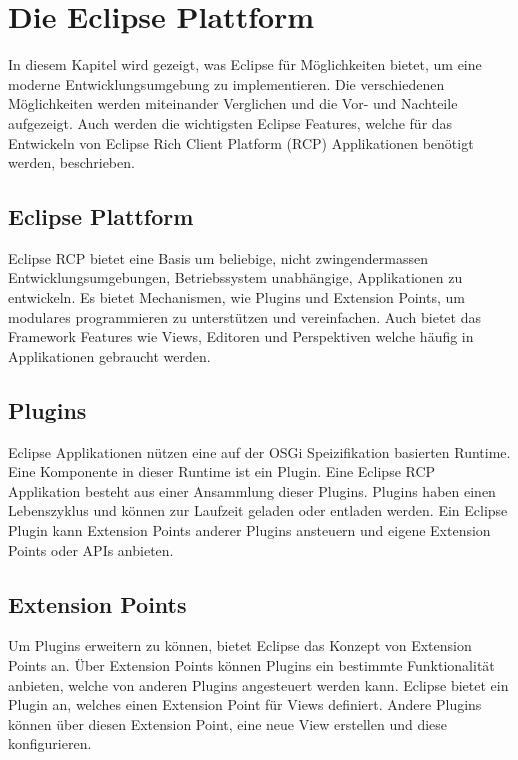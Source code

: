 \chapter{Die Eclipse Plattform}
\label{chap:platform}

In diesem Kapitel wird gezeigt, was Eclipse für Möglichkeiten bietet, um eine moderne Entwicklungsumgebung zu implementieren. Die verschiedenen Möglichkeiten werden miteinander Verglichen und die Vor- und Nachteile aufgezeigt. Auch werden die wichtigsten Eclipse Features, welche für das Entwickeln von Eclipse Rich Client Platform (RCP) Applikationen benötigt werden, beschrieben.

\section{Eclipse Plattform}

Eclipse RCP bietet eine Basis um beliebige, nicht zwingendermassen Entwicklungsumgebungen, Betriebssystem unabhängige, Applikationen zu entwickeln. Es bietet Mechanismen, wie Plugins und Extension Points, um modulares programmieren zu unterstützen und vereinfachen. Auch bietet das Framework Features wie Views, Editoren und Perspektiven welche häufig in Applikationen gebraucht werden.

\section{Plugins}

Eclipse Applikationen nützen eine auf der OSGi Speizifikation basierten Runtime. Eine Komponente in dieser Runtime ist ein Plugin. Eine Eclipse RCP Applikation besteht aus einer Ansammlung dieser Plugins.\cite{whatisaplugin} Plugins haben einen Lebenszyklus und können zur Laufzeit geladen oder entladen werden. Ein Eclipse Plugin kann Extension Points anderer Plugins ansteuern und eigene Extension Points oder APIs anbieten.

\section{Extension Points}
\label{extensionpointssection}

Um Plugins erweitern zu können, bietet Eclipse das Konzept von Extension Points an. Über Extension Points können Plugins ein bestimmte Funktionalität anbieten, welche von anderen Plugins angesteuert werden kann. 
\newline
Eclipse bietet ein Plugin an, welches einen Extension Point für Views definiert. Andere Plugins können über diesen Extension Point, eine neue View erstellen und diese konfigurieren. \cite{extensionpoints}

